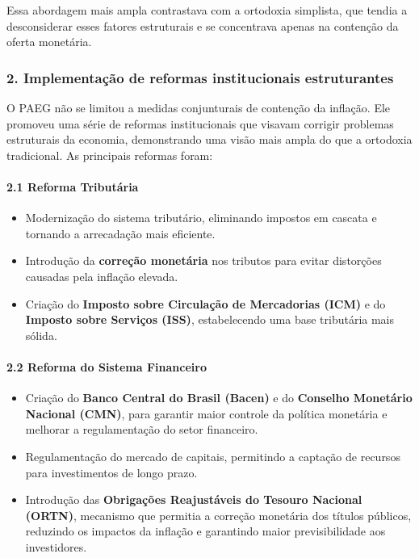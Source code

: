 \documentclass[a4paper,12pt]{article}[abntex2]
\begin{document}
Essa abordagem mais ampla contrastava com a ortodoxia simplista, que tendia a desconsiderar esses fatores estruturais e se concentrava apenas na contenção da oferta monetária.

\subsubsection{2. Implementação de reformas institucionais estruturantes}
O PAEG não se limitou a medidas conjunturais de contenção da inflação. Ele promoveu uma série de reformas institucionais que visavam corrigir problemas estruturais da economia, demonstrando uma visão mais ampla do que a ortodoxia tradicional. As principais reformas foram:

\paragraph{2.1 Reforma Tributária}
\begin{itemize}
    \item Modernização do sistema tributário, eliminando impostos em cascata e tornando a arrecadação mais eficiente.
    \item Introdução da \textbf{correção monetária} nos tributos para evitar distorções causadas pela inflação elevada.
    \item Criação do \textbf{Imposto sobre Circulação de Mercadorias (ICM)} e do \textbf{Imposto sobre Serviços (ISS)}, estabelecendo uma base tributária mais sólida.
\end{itemize}

\paragraph{2.2 Reforma do Sistema Financeiro}
\begin{itemize}
    \item Criação do \textbf{Banco Central do Brasil (Bacen)} e do \textbf{Conselho Monetário Nacional (CMN)}, para garantir maior controle da política monetária e melhorar a regulamentação do setor financeiro.
    \item Regulamentação do mercado de capitais, permitindo a captação de recursos para investimentos de longo prazo.
    \item Introdução das \textbf{Obrigações Reajustáveis do Tesouro Nacional (ORTN)}, mecanismo que permitia a correção monetária dos títulos públicos, reduzindo os impactos da inflação e garantindo maior previsibilidade aos investidores.
\end{itemize}
\end{document}
